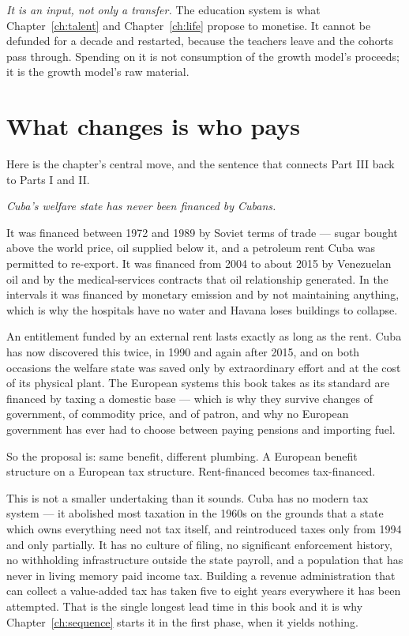 \emph{It is an input, not only a transfer.} The education system is what
Chapter~\ref{ch:talent} and Chapter~\ref{ch:life} propose to monetise. It cannot
be defunded for a decade and restarted, because the teachers leave and the
cohorts pass through. Spending on it is not consumption of the growth model's
proceeds; it is the growth model's raw material.

\section{What changes is who pays}

Here is the chapter's central move, and the sentence that connects Part III back
to Parts I and II.

\emph{Cuba's welfare state has never been financed by Cubans.}

It was financed between 1972 and 1989 by Soviet terms of trade --- sugar bought
above the world price, oil supplied below it, and a petroleum rent Cuba was
permitted to re-export. It was financed from 2004 to about 2015 by Venezuelan
oil and by the medical-services contracts that oil relationship generated. In
the intervals it was financed by monetary emission and by not maintaining
anything, which is why the hospitals have no water and Havana loses buildings to
collapse.

An entitlement funded by an external rent lasts exactly as long as the rent. Cuba
has now discovered this twice, in 1990 and again after 2015, and on both
occasions the welfare state was saved only by extraordinary effort and at the
cost of its physical plant. The European systems this book takes as its standard
are financed by taxing a domestic base --- which is why they survive changes of
government, of commodity price, and of patron, and why no European government
has ever had to choose between paying pensions and importing fuel.

So the proposal is: same benefit, different plumbing. A European benefit
structure on a European tax structure. Rent-financed becomes tax-financed.

This is not a smaller undertaking than it sounds. Cuba has no modern tax system
--- it abolished most taxation in the 1960s on the grounds that a state which
owns everything need not tax itself, and reintroduced taxes only from 1994 and
only partially. It has no culture of filing, no significant enforcement history,
no withholding infrastructure outside the state payroll, and a population that
has never in living memory paid income tax. Building a revenue administration
that can collect a value-added tax has taken five to eight years everywhere it
has been attempted. That is the single longest lead time in this book and it is
why Chapter~\ref{ch:sequence} starts it in the first phase, when it yields
nothing.

